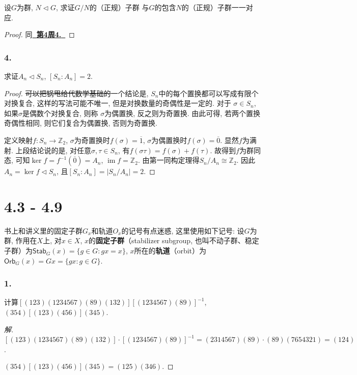 \documentclass[12pt, a4paper, fontset=windows]{ctexart}
\newcommand{\Z}{\mathbb{Z}}
\newcommand{\Orb}{\mathsf{Orb}}
\newcommand{\Stab}{\mathsf{Stab}}
\newcommand{\abs}[1]{\left|{#1}\right|}
\newcommand{\cl}[1]{\overline{#1}} %
\newcommand{\im}{\operatorname{im}}
\newcommand{\isom}{\cong} %
\newcommand{\kh}[1]{（{#1}）} %
\newcommand{\myref}[2][]{\hyperref[#1]{\bf\color{blue}\ {#2}\ }}
\newenvironment{solution}{\begin{proof}[解]}{\end{proof}}
\begin{document}
设$G$为群, $N\lhd G$, 求证$G/N$的\kh{正规}子群
与$G$的包含$N$的\kh{正规}子群一一对应. 

\begin{proof}
同\myref[group-correspond]{第4周4.}
\end{proof}

\section*{4.}

求证$A_n\lhd S_n$, $[S_n:A_n]=2$. 

\begin{proof}
\sout{可以把锅甩给代数学基础的}一个结论是, %
$S_n$中的每个置换都可以写成有限个对换复合, 
这样的写法可能不唯一, 但是对换数量的奇偶性是一定的. 对于
$\sigma\in S_n$, 如果$\sigma$是偶数个对换复合, 则称
$\sigma$为偶置换, 反之则为奇置换. 由此可得, 若两个置换
奇偶性相同, 则它们复合为偶置换, 否则为奇置换. 

定义映射$f:S_n\to\Z_2$, $\sigma$为奇置换时$f(\sigma)=\cl{1}$, 
$\sigma$为偶置换时$f(\sigma)=\cl{0}$. 显然$f$为满射. 
上段结论说的是, 对任意$\sigma,\tau\in S_n$, 
有$f(\sigma\tau)=f(\sigma)+f(\tau)$. 
故得到$f$为群同态, 可知$\ker f=f^{-1}(\cl{0})=A_n$, 
$\im f=\Z_2$. 由第一同构定理得$S_n/A_n\isom\Z_2$. 
因此$A_n=\ker f\lhd S_n$, 且$[S_n:A_n]=\abs{S_n/A_n}=2$. 
\end{proof}

\clearpage
\part{4.3 - 4.9}

书上和讲义里的固定子群$G_x$和轨道$O_x$的记号有点迷惑, 
这里使用如下记号: 设$G$为群, 作用在$X$上, 对$x\in X$, 
$x$的{\bf 固定子群}\kh{stabilizer subgroup, 
也叫不动子群、稳定子群}为$\Stab_G(x)=\{g\in G:gx=x\}$, 
$x$所在的{\bf 轨道}\kh{orbit}为$\Orb_G(x)=Gx=\{gx:g\in G\}$. 

\section*{1.}

计算$[(123)(1234567)(89)(132)][(1234567)(89)]^{-1}$, $(354)[(123)(456)](345)$. 

\begin{solution}
$[(123)(1234567)(89)(132)]\cdot[(1234567)(89)]^{-1}
=(2314567)(89)\cdot(89)(7654321)=(124)$. 

$(354)[(123)(456)](345)=(125)(346)$. 
\end{solution}
\end{document}
